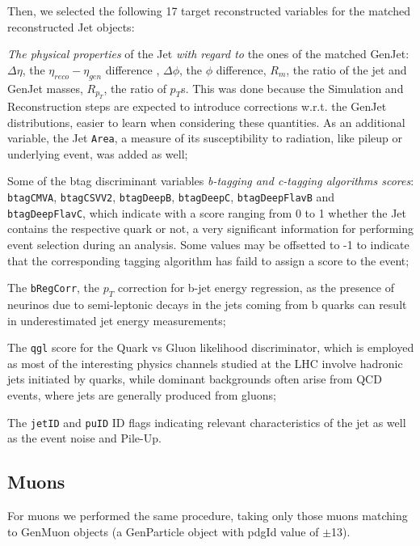 Then, we selected the following 17 target reconstructed variables for the matched reconstructed Jet objects:

\begin{outline}
\1 \emph{The physical properties} of the Jet \emph{with regard to} the ones of the matched GenJet: $\Delta\eta$, the $\eta_{reco} - \eta_{gen}$ difference , $\Delta\phi$, the $\phi$ difference, $R_m$, the ratio of the jet and GenJet masses, $R_{p_T}$, the ratio of $p_T$s. This was done because the Simulation and Reconstruction steps are expected to introduce corrections w.r.t. the GenJet distributions, easier to learn when considering these quantities. As an additional variable, the Jet \texttt{Area}, a measure of its susceptibility to radiation, like pileup or underlying event, was added as well;

\1 Some of the btag discriminant variables \emph{b-tagging and c-tagging algorithms scores}: \texttt{btagCMVA}, \texttt{btagCSVV2}, \texttt{btagDeepB}, \texttt{btagDeepC}, \texttt{btagDeepFlavB} and \\\texttt{btagDeepFlavC}, which indicate with a score ranging from 0 to 1 whether the Jet contains the respective quark or not, a very significant information for performing event selection during an analysis. Some values may be offsetted to -1 to indicate that the corresponding tagging algorithm has faild to assign a score to the event;

\1 The \texttt{bRegCorr}, the $p_T$ correction for b-jet energy regression, as the presence of neurinos due to semi-leptonic decays in the jets coming from b quarks can result in underestimated jet energy measurements;

\1 The \texttt{qgl} score for the Quark vs Gluon likelihood discriminator, which is employed as most of the interesting physics channels studied at the LHC involve hadronic jets initiated by quarks, while dominant backgrounds often arise from QCD events, where jets are generally produced from gluons;

\1 The \texttt{jetID} and \texttt{puID} ID flags indicating relevant characteristics of the jet as well as the event noise and Pile-Up.
\end{outline}
\subsection{Muons}

For muons we performed the same procedure, taking only those muons matching to GenMuon objects (a GenParticle object with pdgId value of $\pm$13). 

